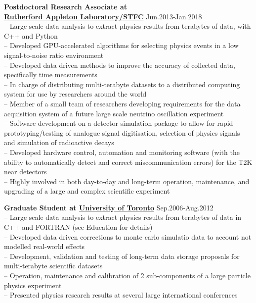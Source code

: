 \documentclass[margin,line]{resume}
\begin{document}
\begin{resume}
\begin{list2}
    \item \textbf{Postdoctoral Research Associate at \\\href{https://www.stfc.ac.uk/index.cfm}{Rutherford Appleton Laboratory/STFC}} \hfill{Jun.2013-Jan.2018}\\
      -- Large scale data analysis to extract physics results from terabytes of data, with C++ and Python\\
      -- Developed GPU-accelerated algorithms for selecting physics events in a low signal-to-noise ratio environment\\
      -- Developed data driven methods to improve the accuracy of collected data, specifically time measurements\\
      -- In charge of distributing multi-terabyte datasets to a distributed computing system for use by researchers around the world\\
      -- Member of a small team of researchers developing requirements for the data acquisition system of a future large scale neutrino oscillation experiment\\
      -- Software development on a detector simulation package to allow for rapid prototyping/testing of analogue signal digitisation, selection of physics signals and simulation of radioactive decays\\
      -- Developed hardware control, automation and monitoring software (with the ability to automatically detect and correct miscommunication errors) for the T2K near detectors\\
      -- Highly involved in both day-to-day and long-term operation, maintenance, and upgrading of a large and complex scientific experiment
    \item \textbf{Graduate Student at \href{https://www.physics.utoronto.ca/}{University of Toronto}} \hfill{Sep.2006-Aug.2012}\\
      -- Large scale data analysis to extract physics results from terabytes of data in C++ and FORTRAN (see Education for details)\\
      -- Developed data driven corrections to monte carlo simulatio data to account not modelled real-world effects\\
      -- Development, validation and testing of long-term data storage proposals for multi-terabyte scientific datasets\\
      -- Operation, maintenance and calibration of 2 sub-components of a large particle physics experiment\\
      -- Presented physics research results at several large international conferences

\end{list2}
\end{resume}
\end{document}
